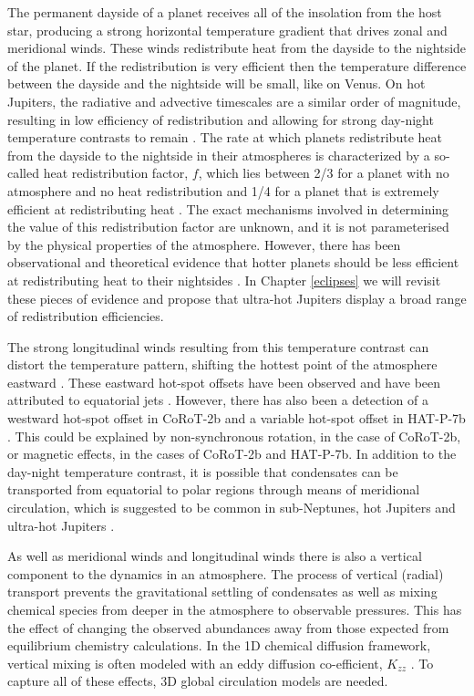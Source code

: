 The permanent dayside of a planet receives all of the insolation from the host star, producing a strong horizontal temperature gradient that drives zonal and meridional winds. These winds redistribute heat from the dayside to the nightside of the planet. If the redistribution is very efficient then the temperature difference between the dayside and the nightside will be small, like on Venus. On hot Jupiters, the radiative and advective timescales are a similar order of magnitude, resulting in low efficiency of redistribution and allowing for strong day-night temperature contrasts to remain \citep[e.g.,][]{Showman2002, Perna2012}. The rate at which planets redistribute heat from the dayside to the nightside in their atmospheres is characterized by a so-called heat redistribution factor, $f$, which lies between 2/3 for a planet with no atmosphere and no heat redistribution and 1/4 for a planet that is extremely efficient at redistributing heat \citep[e.g.,][]{Koll2019}. The exact mechanisms involved in determining the value of this redistribution factor are unknown, and it is not parameterised by the physical properties of the atmosphere. However, there has been observational and theoretical evidence that hotter planets should be less efficient at redistributing heat to their nightsides \citep{PerezBecker2013, Schwartz2015}. In Chapter \ref{eclipses} we will revisit these pieces of evidence and propose that ultra-hot Jupiters display a broad range of redistribution efficiencies.

The strong longitudinal winds resulting from this temperature contrast can distort the temperature pattern, shifting the hottest point of the atmosphere eastward \citep[e.g.,][]{Showman2002}. These eastward hot-spot offsets have been observed and have been attributed to equatorial jets \citep[e.g.,][]{Knutson2012, Cowan2012a}. However, there has also been a detection of a westward hot-spot offset in CoRoT-2b \citep{Dang2018} and a variable hot-spot offset in HAT-P-7b \citep{Armstrong2016}. This could be explained by non-synchronous rotation, in the case of CoRoT-2b, or magnetic effects, in the cases of CoRoT-2b and HAT-P-7b. In addition to the day-night temperature contrast, it is possible that condensates can be transported from equatorial to polar regions through means of meridional circulation, which is suggested to be common in sub-Neptunes, hot Jupiters and ultra-hot Jupiters \citep{Parmentier2013, Ehrenreich2020}.

As well as meridional winds and longitudinal winds there is also a vertical component to the dynamics in an atmosphere. The process of vertical (radial) transport prevents the gravitational settling of condensates as well as mixing chemical species from deeper in the atmosphere to observable pressures. This has the effect of changing the observed abundances away from those expected from equilibrium chemistry calculations. In the 1D chemical diffusion framework, vertical mixing is often modeled with an eddy diffusion co-efficient, $K_{zz}$ \citep[e.g.][]{Zhang2018b, Miles2020}. To capture all of these effects, 3D global circulation models are needed.

